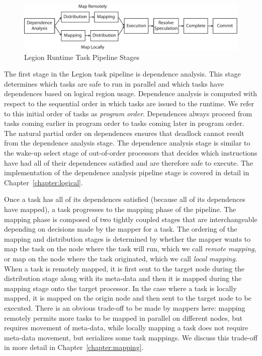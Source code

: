 \begin{figure}[t]
\centering
\includegraphics[scale=0.7]{figs/LegionPipeline}
\caption{Legion Runtime Task Pipeline Stages\label{fig:pipearch}}
\end{figure}

The first stage in the Legion task pipeline is dependence
analysis. This stage determines which tasks are safe to
run in parallel and which tasks have dependences based
on logical region usage. Dependence analysis is computed
with respect to the sequential order in which tasks are
issued to the runtime. We refer to this initial order of tasks as 
{\em program order}. Dependences always proceed from tasks coming
earlier in program order to tasks coming later in program
order. The natural partial order on dependences ensures that
deadlock cannot result from the dependence analysis stage.
The dependence analysis stage is similar to the wake-up
select stage of out-of-order processors that decides which
instructions have had all of their dependences satisfied
and are therefore safe to execute. The implementation of
the dependence analysis pipeline stage is covered in 
detail in Chapter~\ref{chapter:logical}.

Once a task has all of its dependences satisfied (because
all of its dependences have mapped), a task progresses
to the mapping phase of the pipeline. The mapping phase
is composed of two tightly coupled stages that are 
interchangeable depending on decisions made by the mapper
for a task. The ordering of the mapping and distribution
stages is determined by whether the mapper wants to map the
task on the node where the task will run, which we call
{\em remote mapping}, or map on the node where the task 
originated, which we call {\em local mapping}. When a task
is remotely mapped, it is first sent to the target node
during the distribution stage along with its meta-data
and then it is mapped during the mapping stage onto
the target processor.  In the case where a task is locally
mapped, it is mapped on the origin node and then sent to
the target node to be executed.  There is an obvious
trade-off to be made by mappers here: mapping remotely
permits more tasks to be mapped in parallel on different 
nodes, but requires movement of meta-data, while locally 
mapping a task does not require meta-data movement, but 
serializes some task mappings. We discuss this trade-off 
in more detail in Chapter~\ref{chapter:mapping}.

